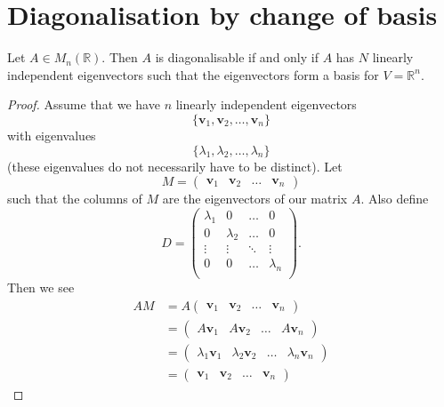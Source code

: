 \section{Diagonalisation by change of basis}

\begin{proposition}
    Let $A \in M_n(\mathbb{R})$. Then $A$ is diagonalisable if and only if $A$ has $N$ linearly independent eigenvectors such that the eigenvectors form a basis for $V = \mathbb{R}^n$.
\end{proposition}

\begin{proof}
    Assume that we have $n$ linearly independent eigenvectors \[ \{ \bm{v}_1, \bm{v}_2, \ldots, \bm{v}_n \} \] with eigenvalues \[ \{ \lambda_1, \lambda_2, \ldots, \lambda_n \} \] (these eigenvalues do not necessarily have to be distinct). Let 
    \[
        M =
        \begin{pmatrix}
            \bm{v}_1 & \bm{v}_2 & \ldots & \bm{v}_n
        \end{pmatrix}
    \]
    such that the columns of $M$ are the eigenvectors of our matrix $A$. Also define
    \[
        D =
        \begin{pmatrix}
            \lambda_1 & 0 & \ldots & 0 \\
            0 & \lambda_2 & \ldots & 0 \\
            \vdots & \vdots & \ddots & \vdots \\
            0 & 0 & \ldots & \lambda_n \\
        \end{pmatrix}.
    \]
    Then we see
    \begin{align*}
        AM &= A
        \begin{pmatrix}
            \bm{v}_1 & \bm{v}_2 & \ldots & \bm{v}_n
        \end{pmatrix}
        \\
        &= 
        \begin{pmatrix}
            A\bm{v}_1 & A\bm{v}_2 & \ldots & A\bm{v}_n 
        \end{pmatrix}
        \\
        &=
        \begin{pmatrix}
            \lambda_1 \bm{v}_1 & \lambda_2 \bm{v}_2 & \ldots & \lambda_n \bm{v}_n
        \end{pmatrix}
        \\
        &=
        \begin{pmatrix}
            \bm{v}_1 & \bm{v}_2 & \ldots & \bm{v}_n

\end{pmatrix}
\end{align*}
\end{proof}
